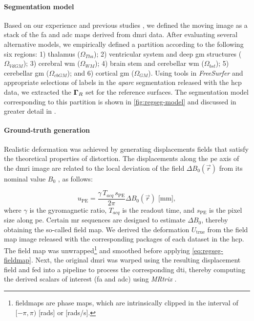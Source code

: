 \paragraph*{Segmentation model}
Based on our experience %
  and previous studies \citep{ennis_orthogonal_2006},
  we defined the moving image as a stack of the \gls*{fa} and \gls*{adc} maps derived
  from \gls*{dmri} data.
After evaluating several alternative models, we empirically defined a partition \omegaset{}
  according to the following six regions:
  1) thalamus ($\Omega_{Tha}$);
  2) ventricular system and deep \gls*{gm} structures ($\Omega_{VdGM}$);
  3) cerebral \gls*{wm} ($\Omega_{WM}$);
  4) brain stem and cerebellar \gls*{wm} ($\Omega_{bst}$);
  5) cerebellar \gls*{gm} ($\Omega_{cbGM}$); and
  6) cortical \gls*{gm} ($\Omega_{GM}$).
Using tools in \emph{FreeSurfer} and appropriate selections of labels in the
  \emph{aparc} segmentation released with the \gls*{hcp} data, we extracted the $\boldsymbol{\Gamma}_R$ set for the
  reference surfaces.
The segmentation model corresponding to this partition is shown in \autoref{fig:regseg-model}
  and discussed in greater detail in .

\paragraph*{Ground-truth generation}
Realistic deformation was achieved by generating displacements fields that satisfy the theoretical
  properties of distortion.
The displacements along the \gls*{pe} axis of the \gls*{dmri} image are related to the local
  deviation of the field $\Delta B_0(\vec{r})$ from its nominal value $B_0$  \citep{jezzard_correction_1995},
  as follows:

  \begin{equation}
  u_\text{PE} = \frac{\gamma \, T_{acq}\, s_\text{PE}}{2\pi}\Delta B_0(\vec{r})\text{ [mm]},
  \label{eq:regseg-fieldmap}
  \end{equation}
where $\gamma$ is the gyromagnetic ratio, $T_{acq}$ is the readout time, and
  $s_\text{PE}$ is the pixel size along \gls*{pe}.
Certain \gls*{mr} sequences are designed to estimate $\Delta B_0$, thereby obtaining
  the so-called field map.
We derived the deformation $U_\text{true}$ from the field map image released with
  the corresponding packages of each dataset in the \gls*{hcp}.
The field map was unwrapped\footnote{fieldmaps are phase maps, which are intrinsically clipped in the interval
  of $[-\pi, \pi)$ [rads] or [rads/s].} and smoothed before applying \eqref{eq:regseg-fieldmap}.
Next, the original \gls*{dmri} was warped using the resulting displacement field and fed into
  a pipeline to process the corresponding \gls*{dti}, thereby computing the derived scalars of
  interest (\gls*{fa} and \gls*{adc}) using \emph{MRtrix} \citep{tournier_mrtrix_2012}.

